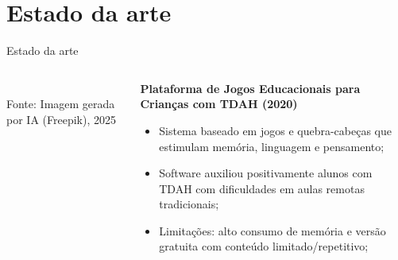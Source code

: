 \documentclass{beamer}
\begin{document}

\section{Estado da arte}
\begin{frame}{Estado da arte}
    \begin{columns}
        \begin{column}{0.35\textwidth}
            \centering
            \\[0.3cm]
            \tiny\textcolor{cpsgray}{Fonte: Imagem gerada por IA (Freepik), 2025}
        \end{column}
        
        \begin{column}{0.6\textwidth}
            \justifying
            \textbf{Plataforma de Jogos Educacionais para Crianças com TDAH (2020)}
            \begin{itemize}
                \item Sistema baseado em jogos e quebra-cabeças que estimulam memória, linguagem e pensamento;
                
                \item Software auxiliou positivamente alunos com TDAH com dificuldades em aulas remotas tradicionais;
                
                \item Limitações: alto consumo de memória e versão gratuita com conteúdo limitado/repetitivo;
            \end{itemize}
        \end{column}
    \end{columns}
\end{frame}
\end{document}
